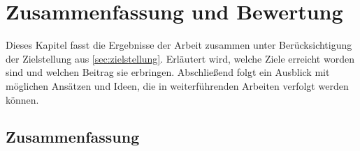 %

\chapter{Zusammenfassung und Bewertung}\label{ch:zusammenfassung-bewertung}


Dieses Kapitel fasst die Ergebnisse der Arbeit zusammen unter Berücksichtigung der Zielstellung aus \autoref{sec:zielstellung}. Erläutert wird, welche Ziele erreicht worden sind und welchen Beitrag sie erbringen. Abschließend folgt ein Ausblick mit möglichen Ansätzen und Ideen, die in weiterführenden Arbeiten verfolgt werden können.


\section{Zusammenfassung}\label{sec:zusammenfassung}


